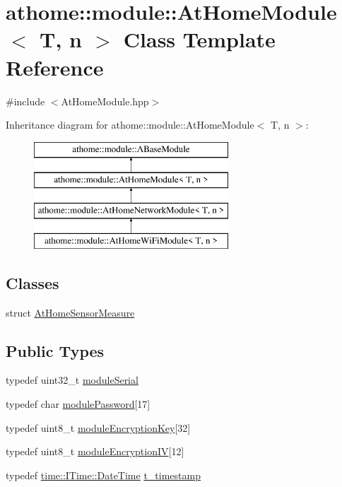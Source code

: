\hypertarget{classathome_1_1module_1_1_at_home_module}{}\section{athome\+:\+:module\+:\+:At\+Home\+Module$<$ T, n $>$ Class Template Reference}
\label{classathome_1_1module_1_1_at_home_module}


{\ttfamily \#include $<$At\+Home\+Module.\+hpp$>$}

Inheritance diagram for athome\+:\+:module\+:\+:At\+Home\+Module$<$ T, n $>$\+:\begin{figure}[H]
\begin{center}
\leavevmode
\includegraphics[height=4.000000cm]{classathome_1_1module_1_1_at_home_module}
\end{center}
\end{figure}
\subsection*{Classes}
\begin{DoxyCompactItemize}
\item 
struct \mbox{\hyperlink{structathome_1_1module_1_1_at_home_module_1_1_at_home_sensor_measure}{At\+Home\+Sensor\+Measure}}
\end{DoxyCompactItemize}
\subsection*{Public Types}
\begin{DoxyCompactItemize}
\item 
typedef uint32\+\_\+t \mbox{\hyperlink{classathome_1_1module_1_1_at_home_module_aaa31c8eddb689010ef59deba4e1463c6}{module\+Serial}}
\item 
typedef char \mbox{\hyperlink{classathome_1_1module_1_1_at_home_module_a628bd00cf83073b87c41a3ce2b362a9c}{module\+Password}}\mbox{[}17\mbox{]}
\item 
typedef uint8\+\_\+t \mbox{\hyperlink{classathome_1_1module_1_1_at_home_module_adcc0f673f2ccb3e3f3619fda97adadcf}{module\+Encryption\+Key}}\mbox{[}32\mbox{]}
\item 
typedef uint8\+\_\+t \mbox{\hyperlink{classathome_1_1module_1_1_at_home_module_a75cae8d69276f23834dda9b23da17707}{module\+Encryption\+IV}}\mbox{[}12\mbox{]}
\item 
typedef \mbox{\hyperlink{structathome_1_1time_1_1_i_time_1_1_date_time}{time\+::\+I\+Time\+::\+Date\+Time}} \mbox{\hyperlink{classathome_1_1module_1_1_at_home_module_a74611fcc9d7580bded68899a4fd9c930}{t\+\_\+timestamp}}
\end{DoxyCompactItemize}
